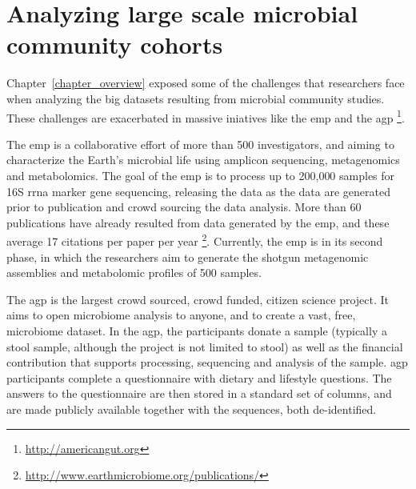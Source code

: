 \documentclass[12pt,chapterheads]{ucsd}
\begin{document}
\chapter{Analyzing large scale microbial community cohorts}\label{chapter_book}
\glsresetall

Chapter~\ref{chapter_overview} exposed some of the challenges that researchers
face when analyzing the big datasets resulting from microbial community
studies. These challenges are exacerbated in massive iniatives like
the \gls{emp} \cite{Gilbert2010, Gilbert2014, Thompson2017} and the \gls{agp}
\footnote{\label{agpurl}\url{http://americangut.org}}.

The \gls{emp} is a collaborative effort of more than 500 investigators, and aiming
to characterize the Earth's microbial life using amplicon sequencing,
metagenomics and metabolomics. The goal of the \gls{emp} is to process up to 200,000
samples for 16S \gls{rrna} marker gene sequencing, releasing the data as the data are
generated prior to publication and
crowd sourcing the data analysis. More than 60 publications have already resulted
from data generated by the \gls{emp}, and these average 17 citations per paper per year
\footnote{\label{emppuburl}\url{http://www.earthmicrobiome.org/publications/}}.
Currently, the \gls{emp} is in its second phase, in which the researchers aim to
generate the shotgun metagenomic assemblies and metabolomic profiles of 500 samples.

The \gls{agp} is the largest crowd sourced, crowd funded, citizen science project. It aims to
open microbiome analysis to anyone, and to create a vast, free, microbiome dataset.
In the \gls{agp}, the participants donate a sample (typically a stool sample,
although the project is not limited to stool) as well as the financial contribution
that supports processing, sequencing and analysis of the sample. \gls{agp} participants complete a
questionnaire with dietary and lifestyle questions. The answers to the
questionnaire are then stored in a standard set of columns, and are
made publicly available together with the sequences, both de-identified.
\end{document}
